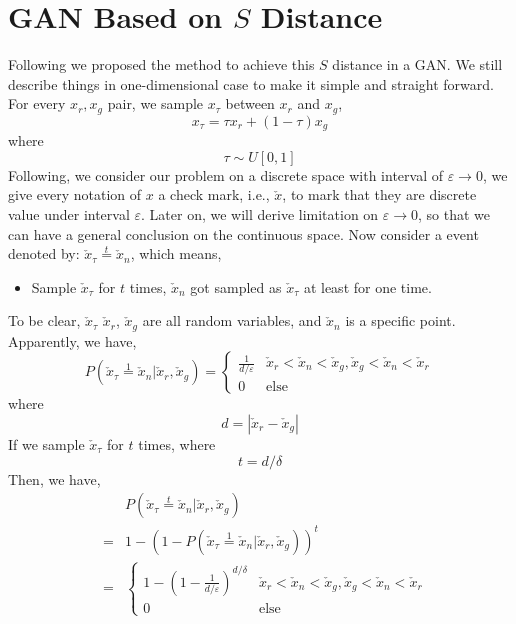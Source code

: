 \documentclass[letterpaper]{article} %
\begin{document}
\section{GAN Based on $S$ Distance}
Following we proposed the method to achieve this $S$ distance in a GAN.
We still describe things in one-dimensional case to make it simple and straight forward.
For every $x_{r}, x_{g}$ pair, we sample $x_{\tau}$ between $x_{r}$ and $x_g$,
\begin{equation}\label{x-epsilon}
  x_{\tau} = \tau x_{r} + (1-\tau) x_g
\end{equation}
where
\begin{equation}\label{epsilon}
  \tau \sim U[0,1]
\end{equation}
Following, we consider our problem on a discrete space with interval of $\varepsilon\rightarrow 0$, we give every notation of $x$ a check mark, i.e., $\check{x}$, to mark that they are discrete value under interval $\varepsilon$.
Later on, we will derive limitation on $\varepsilon\rightarrow 0$, so that we can have a general conclusion on the continuous space.
Now consider a event denoted by: $\check{x}_\tau\overset{t}{=}\check{x}_n$, which means,
\begin{itemize}
  \item Sample $\check{x}_\tau$ for $t$ times, $\check{x}_n$ got sampled as $\check{x}_\tau$ at least for one time.
\end{itemize}
To be clear, $\check{x}_\tau$ $\check{x}_r$, $\check{x}_g$ are all random variables, and $\check{x}_n$ is a specific point.
Apparently, we have,
\begin{equation}\label{p-epsilon-pr-pg}
    P(\check{x}_\tau\overset{1}{=}\check{x}_n|\check{x}_r,\check{x}_g)=
    \begin{cases}
        \frac{1}{d/\varepsilon} &\mbox{$\check{x}_r<\check{x}_n<\check{x}_g,\check{x}_g<\check{x}_n<\check{x}_r$}\\
        0 &\mbox{else}
    \end{cases}
\end{equation}
where
\begin{equation}\label{d}
  d=|\check{x}_r-\check{x}_g|
\end{equation}
If we sample $\check{x}_\tau$ for $t$ times, where
\begin{equation}\label{T}
  t = d/{\delta}
\end{equation}
Then, we have,
\begin{eqnarray}\label{p-tau}
    && P(\check{x}_\tau\overset{t}{=}\check{x}_n|\check{x}_r,\check{x}_g) \nonumber\\
    &=& 1 - (1-P(\check{x}_\tau\overset{1}{=}\check{x}_n|\check{x}_r,\check{x}_g))^t \nonumber\\
    &=&
    \begin{cases}
        1 - (1-\frac{1}{d/\varepsilon})^{d/\delta} &\mbox{$\check{x}_r<\check{x}_n<\check{x}_g,\check{x}_g<\check{x}_n<\check{x}_r$}\\
        0 &\mbox{else}
    \end{cases}
\end{eqnarray}
\end{document}
